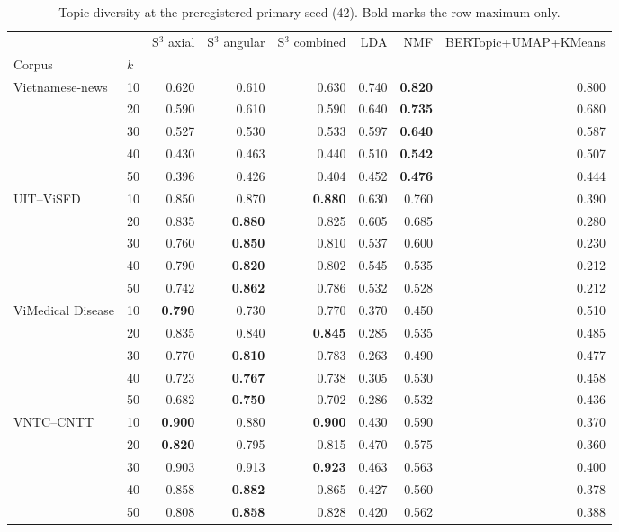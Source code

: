 \begin{table}[t]
\centering
\scriptsize
\caption{Topic diversity at the preregistered primary seed (42). Bold marks the row maximum only.}
\label{tab:cafebert-diversity-seed42}
\begin{tabular}{llrrrrrr}
\toprule
 &  & S$^3$ axial & S$^3$ angular & S$^3$ combined & LDA & NMF & BERTopic+UMAP+KMeans \\
Corpus & $k$ &  &  &  &  &  &  \\
\midrule
\multirow[t]{5}{*}{Vietnamese-news} & 10 & 0.620 & 0.610 & 0.630 & 0.740 & \textbf{0.820} & 0.800 \\
 & 20 & 0.590 & 0.610 & 0.590 & 0.640 & \textbf{0.735} & 0.680 \\
 & 30 & 0.527 & 0.530 & 0.533 & 0.597 & \textbf{0.640} & 0.587 \\
 & 40 & 0.430 & 0.463 & 0.440 & 0.510 & \textbf{0.542} & 0.507 \\
 & 50 & 0.396 & 0.426 & 0.404 & 0.452 & \textbf{0.476} & 0.444 \\
\cline{1-8}
\multirow[t]{5}{*}{UIT--ViSFD} & 10 & 0.850 & 0.870 & \textbf{0.880} & 0.630 & 0.760 & 0.390 \\
 & 20 & 0.835 & \textbf{0.880} & 0.825 & 0.605 & 0.685 & 0.280 \\
 & 30 & 0.760 & \textbf{0.850} & 0.810 & 0.537 & 0.600 & 0.230 \\
 & 40 & 0.790 & \textbf{0.820} & 0.802 & 0.545 & 0.535 & 0.212 \\
 & 50 & 0.742 & \textbf{0.862} & 0.786 & 0.532 & 0.528 & 0.212 \\
\cline{1-8}
\multirow[t]{5}{*}{ViMedical Disease} & 10 & \textbf{0.790} & 0.730 & 0.770 & 0.370 & 0.450 & 0.510 \\
 & 20 & 0.835 & 0.840 & \textbf{0.845} & 0.285 & 0.535 & 0.485 \\
 & 30 & 0.770 & \textbf{0.810} & 0.783 & 0.263 & 0.490 & 0.477 \\
 & 40 & 0.723 & \textbf{0.767} & 0.738 & 0.305 & 0.530 & 0.458 \\
 & 50 & 0.682 & \textbf{0.750} & 0.702 & 0.286 & 0.532 & 0.436 \\
\cline{1-8}
\multirow[t]{5}{*}{VNTC--CNTT} & 10 & \textbf{0.900} & 0.880 & \textbf{0.900} & 0.430 & 0.590 & 0.370 \\
 & 20 & \textbf{0.820} & 0.795 & 0.815 & 0.470 & 0.575 & 0.360 \\
 & 30 & 0.903 & 0.913 & \textbf{0.923} & 0.463 & 0.563 & 0.400 \\
 & 40 & 0.858 & \textbf{0.882} & 0.865 & 0.427 & 0.560 & 0.378 \\
 & 50 & 0.808 & \textbf{0.858} & 0.828 & 0.420 & 0.562 & 0.388 \\
\cline{1-8}
\bottomrule
\end{tabular}

\end{table}
